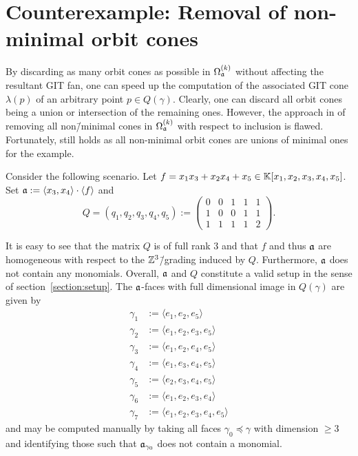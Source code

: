 \section{Counterexample: Removal of non-minimal orbit cones}

By discarding as many orbit cones as possible in $\Omega_{\mathfrak{a}}^{(k)}$ without affecting the resultant GIT fan, one can speed up the computation of the associated GIT cone $\lambda(p)$ of an arbitrary point $p\in Q(\gamma)$. Clearly, one can discard all orbit cones being a union or intersection of the remaining ones. However, the approach in \cite{gitfan_symmetry} of removing all non\=/minimal cones in $\Omega_{\mathfrak{a}}^{(k)}$ with respect to inclusion is flawed. Fortunately, \cite[Theorem 1.1]{gitfan_symmetry} still holds as all non-minimal orbit cones are unions of minimal ones for the \msix{} example.

Consider the following scenario. Let $f = x_1x_3+x_2x_4+x_5\in \mathbb{K}[x_1,x_2,x_3,x_4,x_5]$. Set  $\mathfrak{a} := \langle x_3, x_4\rangle \cdot \langle f\rangle$ and
$$Q = (q_1, q_2, q_3, q_4, q_5) := \begin{pmatrix}
0 & 0 & 1 & 1 & 1 \\
1 & 0 & 0 & 1 & 1 \\
1 & 1 & 1 & 1 & 2 
\end{pmatrix}.$$

It is easy to see that the matrix $Q$ is of full rank 3 and that $f$ and thus $\mathfrak{a}$ are homogeneous with respect to the $\mathbb{Z}^3$\=/grading induced by $Q$. Furthermore, $\mathfrak{a}$ does not contain any monomials. Overall, $\mathfrak{a}$ and $Q$ constitute a valid setup in the sense of section~\ref{section:setup}. The $\mathfrak{a}$-faces with full dimensional image in $Q(\gamma)$ are given by
\begin{align*}
\gamma_1 &:=\langle e_1, e_2, e_5\rangle \\
\gamma_2 &:=\langle e_1, e_2, e_3, e_5\rangle \\
\gamma_3 &:=\langle e_1, e_2, e_4, e_5\rangle \\
\gamma_4 &:=\langle e_1, e_3, e_4, e_5\rangle \\
\gamma_5 &:=\langle e_2, e_3, e_4, e_5\rangle \\
\gamma_6 &:=\langle e_1, e_2, e_3, e_4\rangle \\
\gamma_7 &:=\langle e_1, e_2, e_3, e_4, e_5\rangle
\end{align*}
and may be computed manually by taking all faces $\gamma_0\preceq \gamma$ with dimension $\geq 3$ and identifying those such that $\mathfrak{a}_{\gamma_0}$ does not contain a monomial.

